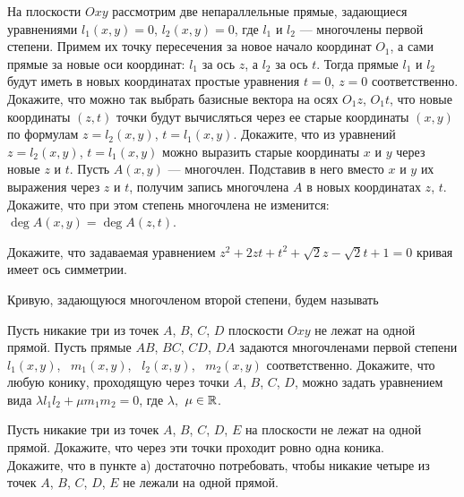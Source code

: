 \documentclass[a4paper,11pt]{article}
\begin{document}

\vspace*{-2mm}
\vspace*{-2mm}




 На плоскости $Oxy$ рассмотрим две
непараллельные  прямые, задающиеся  уравнениями
$l_1(x,y)=0$, $l_2(x,y)=0$, где $l_1$ и $l_2$ --- многочлены первой степени.
Примем их точку пересечения  за новое начало координат $O_1$,
а сами прямые за новые оси координат:  $l_1$ за ось $z$,
а $l_2$ за ось $t$.
Тогда прямые $l_1$ и $l_2$ будут иметь в новых координатах
простые уравнения $t=0$, $z=0$ соответственно.
  Докажите, что можно так выбрать базисные вектора на осях
$O_1z$, $O_1t$, что новые координаты $(z,t)$ точки будут
вычисляться через ее старые координаты $(x,y)$
по формулам $z=l_2(x,y)$, $t=l_1(x,y)$.
 Докажите, что из уравнений $z=l_2(x,y)$, $t=l_1(x,y)$
можно выразить старые координаты $x$ и $y$ через новые $z$ и $t$.
 Пусть $A(x,y)$ --- многочлен. Подставив в него
вместо $x$ и $y$ их выражения через $z$ и $t$, получим запись многочлена
$A$  в новых координатах $z$, $t$.
Докажите, что при этом степень многочлена не
изменится: $\deg A(x,y)=\deg A(z,t)$.


 Докажите, что задаваемая уравнением %
$z^2+2zt+t^2+\sqrt2z-\sqrt2t +1=0$ кривая имеет ось симметрии.


 Кривую, задающуюся многочленом второй степени, будем называть

 \label{abcd}
Пусть никакие три из точек $A$, $B$, $C$, $D$ плоскости $Oxy$ не лежат
на одной прямой. Пусть прямые $AB$, $BC$, $CD$, $DA$ задаются многочленами
первой степени
$l_1(x,y)$, \ $m_1(x,y)$, \ $l_2(x,y)$, \ $m_2(x,y)$ соответственно. Докажите, что  любую конику,
проходящую через  точки $A$, $B$, $C$, $D$, можно задать уравнением
вида
$\lambda l_1l_2+\mu m_1m_2=0$, где $\lambda,$ $\mu\in\mathbb{R}$.

 Пусть никакие три из точек $A$, $B$, $C$, $D$, $E$ на плоскости не
лежат на одной прямой. Докажите, что
через эти точки %
проходит ровно одна коника.  \\ %
 Докажите, что в пункте а) достаточно потребовать, чтобы никакие четыре
из точек $A$, $B$, $C$, $D$, $E$ не лежали на одной прямой.
\end{document}
